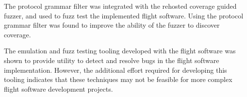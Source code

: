 \documentclass[../report.tex]{subfiles}
\begin{document}
The protocol grammar filter was integrated with the rehosted coverage guided
fuzzer, and used to fuzz test the implemented flight software. Using the
protocol grammar filter was found to improve the ability of the fuzzer to
discover coverage.

The emulation and fuzz testing tooling developed with the flight software was
shown to provide utility to detect and resolve bugs in the flight software
implementation. However, the additional effort required for developing this
tooling indicates that these techniques may not be feasible for more complex
flight software development projects.
\end{document}
